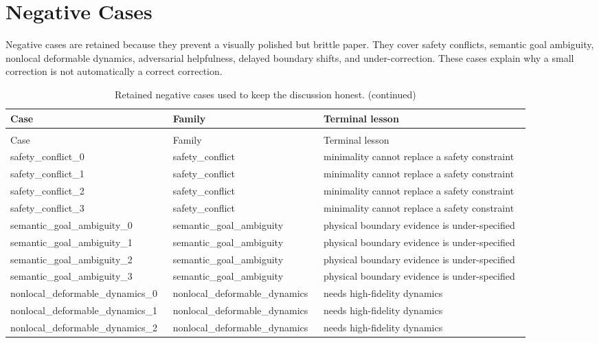 \documentclass{article}
\begin{document}
\section{Negative Cases}
Negative cases are retained because they prevent a visually polished but brittle paper. They cover safety conflicts, semantic goal ambiguity, nonlocal deformable dynamics, adversarial helpfulness, delayed boundary shifts, and under-correction. These cases explain why a small correction is not automatically a correct correction.
\begin{center}
\scriptsize
\begin{longtable}{p{0.25\linewidth}p{0.25\linewidth}p{0.38\linewidth}}
\caption{Retained negative cases used to keep the discussion honest.}\label{tab:negative}\\
\toprule
Case & Family & Terminal lesson\\
\midrule
\endfirsthead
\caption[]{Retained negative cases used to keep the discussion honest. (continued)}\\
\toprule
Case & Family & Terminal lesson\\
\midrule
\endhead
safety\_conflict\_0 & safety\_conflict & minimality cannot replace a safety constraint\\
safety\_conflict\_1 & safety\_conflict & minimality cannot replace a safety constraint\\
safety\_conflict\_2 & safety\_conflict & minimality cannot replace a safety constraint\\
safety\_conflict\_3 & safety\_conflict & minimality cannot replace a safety constraint\\
semantic\_goal\_ambiguity\_0 & semantic\_goal\_ambiguity & physical boundary evidence is under-specified\\
semantic\_goal\_ambiguity\_1 & semantic\_goal\_ambiguity & physical boundary evidence is under-specified\\
semantic\_goal\_ambiguity\_2 & semantic\_goal\_ambiguity & physical boundary evidence is under-specified\\
semantic\_goal\_ambiguity\_3 & semantic\_goal\_ambiguity & physical boundary evidence is under-specified\\
nonlocal\_deformable\_dynamics\_0 & nonlocal\_deformable\_dynamics & needs high-fidelity dynamics\\
nonlocal\_deformable\_dynamics\_1 & nonlocal\_deformable\_dynamics & needs high-fidelity dynamics\\
nonlocal\_deformable\_dynamics\_2 & nonlocal\_deformable\_dynamics & needs high-fidelity dynamics\\

\end{longtable}
\end{center}
\end{document}
